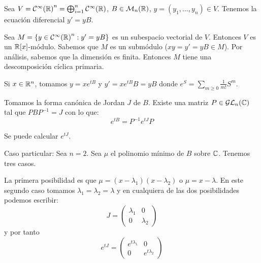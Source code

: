 \begin{ejemplo}
  Sea \(V={\mathcal{C}^\infty(\mathbb{R})}^n=\bigoplus_{i=1}^n\mathcal{C}^\infty(\mathbb{R})\),
  \(B\in\mathcal{M}_n(\mathbb{R})\), \(y=(y_1,\ldots,y_n)\in V\).
  Tenemos la ecuación diferencial \(y'=yB\).

  Sea \(M=\{y\in{\mathcal{C}^\infty(\mathbb{R})}^n: y'=yB\}\) es un subespacio vectorial
  de \(V\). Entonces \(V\) es un \(\mathbb{R}[x]\)-módulo. Sabemos que \(M\)
  es un submódulo (\(xy=y'=yB\in M\)). Por análisis, sabemos que
  la dimensión es finita. Entonces \(M\) tiene una descomposición cíclica
  primaria.

  Si \(x\in\mathbb{R}^n\), tomamos \(y=xe^{tB}\) y \(y'=xe^{tB}B=yB\)
  donde \(e^S=\sum_{m\ge 0}\frac{1}{m!}S^m\).

  Tomamos la forma canónica de Jordan \(J\) de \(B\). Existe una matriz
  \(P\in\mathcal{GL}_n(\mathbb{C})\) tal que \(PBP^{-1}=J\) con lo que:
  \[
    e^{tB}=P^{-1}e^{tJ}P
  \]

  Se puede calcular \(e^{tJ}\).

  Caso particular: Sea \(n=2\). Sea \(\mu\) el polinomio mínimo de \(B\)
  sobre \(\mathbb{C}\). Tenemos tres casos.

  La primera posibilidad es que \(\mu=(x-\lambda_1)(x-\lambda_2)\)
  o \(\mu=x-\lambda\). En este segundo caso tomamos \(\lambda_1
  =\lambda_2=\lambda\) y en cualquiera de las dos posibilidades
  podemos escribir:
  \[
    J=\begin{pmatrix}
        \lambda_1& 0\\
        0&         \lambda_2
      \end{pmatrix}
  \]
  y por tanto
  \[
      e^{tJ}=\begin{pmatrix}
               e^{t\lambda_1}& 0\\
               0&         e^{t\lambda_2}
             \end{pmatrix}
           \]


\end{ejemplo}
